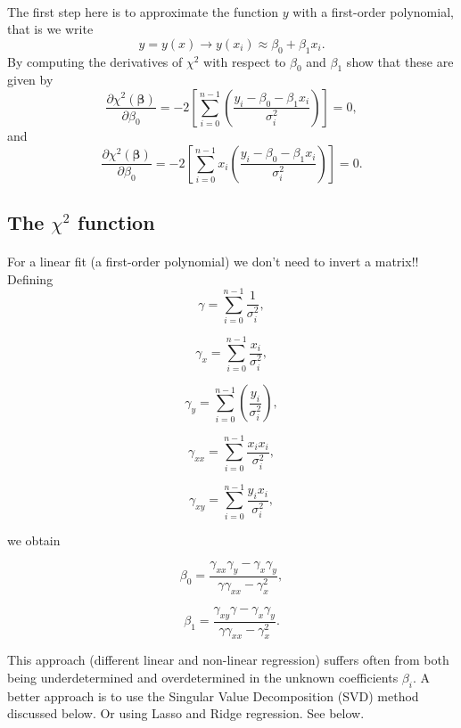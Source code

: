 \documentclass[%
oneside,                 %
final,                   %
10pt]{article}
\begin{document}
\paragraph{}
The first step here is to approximate the function $y$ with a first-order polynomial, that is we write
\[
y=y(x) \rightarrow y(x_i) \approx \beta_0+\beta_1 x_i.
\]
By computing the derivatives of $\chi^2$ with respect to $\beta_0$ and $\beta_1$ show that these are given by
\[
\frac{\partial \chi^2(\bm{\beta})}{\partial \beta_0} = -2\left[ \sum_{i=0}^{n-1}\left(\frac{y_i-\beta_0-\beta_1x_{i}}{\sigma_i^2}\right)\right]=0,
\]
and
\[
\frac{\partial \chi^2(\bm{\beta})}{\partial \beta_0} = -2\left[ \sum_{i=0}^{n-1}x_i\left(\frac{y_i-\beta_0-\beta_1x_{i}}{\sigma_i^2}\right)\right]=0.
\]



\subsection*{The $\chi^2$ function}

\paragraph{}

For a linear fit (a first-order polynomial) we don't need to invert a matrix!!  
Defining
\[
\gamma =  \sum_{i=0}^{n-1}\frac{1}{\sigma_i^2},
\]

\[
\gamma_x =  \sum_{i=0}^{n-1}\frac{x_{i}}{\sigma_i^2},
\]

\[
\gamma_y = \sum_{i=0}^{n-1}\left(\frac{y_i}{\sigma_i^2}\right),
\]

\[
\gamma_{xx} =  \sum_{i=0}^{n-1}\frac{x_ix_{i}}{\sigma_i^2},
\]

\[
\gamma_{xy} = \sum_{i=0}^{n-1}\frac{y_ix_{i}}{\sigma_i^2},
\]

we obtain

\[
\beta_0 = \frac{\gamma_{xx}\gamma_y-\gamma_x\gamma_y}{\gamma\gamma_{xx}-\gamma_x^2},
\]

\[
\beta_1 = \frac{\gamma_{xy}\gamma-\gamma_x\gamma_y}{\gamma\gamma_{xx}-\gamma_x^2}.
\]

This approach (different linear and non-linear regression) suffers
often from both being underdetermined and overdetermined in the
unknown coefficients $\beta_i$.  A better approach is to use the
Singular Value Decomposition (SVD) method discussed below. Or using
Lasso and Ridge regression. See below.
\end{document}
